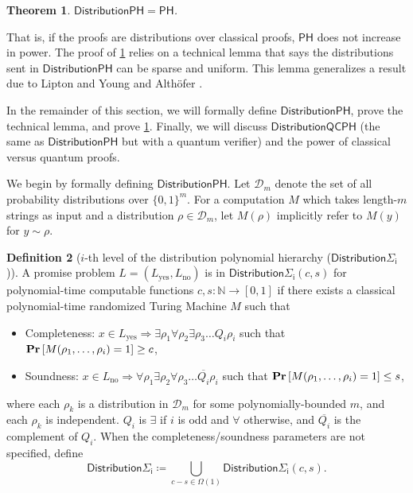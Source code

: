 \documentclass[10pt,a4paper]{article}
\newtheorem{theorem}{Theorem}[section]
\theoremstyle{definition}
\newtheorem{definition}[theorem]{Definition}
\renewcommand{\Pr}{\mathop{\bf Pr\/}}
\newcommand{\nats}{\mathbb N}
\newcommand{\N}{\nats}
\newcommand{\class}[1]{\ensuremath{\mathsf{#1}}\xspace}
\newcommand{\PH}{\class{PH}}
\newcommand{\distributionPH}{\mixedPH}
\newcommand{\distributionQCPH}{\mathsf{DistributionQCPH}}
\newcommand{\mixedPH}{\class{DistributionPH}}
\newcommand{\mixedSigmai}[1][i]{\mathsf{Distribution\Sigma_{#1}}}
\newcommand{\calD}{\mathcal{D}}
\begin{document}
\begin{theorem}\label{thm:mixedph=ph}
    $\mixedPH = \PH$.
\end{theorem}

That is, if the proofs are distributions over classical proofs, $\PH$ does not increase in power.
The proof of \cref{thm:mixedph=ph} relies on a technical lemma that says the distributions sent in $\mixedPH$ can be sparse and uniform. This lemma generalizes a result due to Lipton and Young \cite{lipton1994simple} and Althöfer \cite{ALTHOFER1994339}. 

In the remainder of this section, we will formally define $\distributionPH$, prove the technical lemma, and prove \cref{thm:mixedph=ph}. 
Finally, we will discuss $\distributionQCPH$ (the same as $\distributionPH$ but with a quantum verifier) and the power of classical versus quantum proofs.


We begin by formally defining $\mixedPH$.
Let $\calD_m$ denote the set of all probability distributions over $\{0,1\}^m$.
For a computation $M$ which takes length-$m$ strings as input and a distribution $\rho\in\calD_m$, let $M(\rho)$ implicitly refer to $M(y)$ for $y\sim \rho$.

\begin{definition}[$i$-th level of the distribution polynomial hierarchy ($\mixedSigmai$)]
    A promise problem $L =(L_{\text{yes}},L_{\text{no}})$ is in $\mixedSigmai(c,s)$ for polynomial-time computable functions $c,s : \N \to [0,1]$ if there exists a classical polynomial-time randomized Turing Machine $M$ such that
    \begin{itemize}
        \item Completeness: $x\in L_{\text{yes}} \Rightarrow \exists \rho_1 \forall \rho_2 \exists \rho_3 \dots Q_i \rho_i$ such that $\Pr\left[M(\rho_1,\dots,\rho_i) = 1\right] \geq c$,
        \item Soundness: $x\in L_{\text{no}} \Rightarrow \forall \rho_1 \exists \rho_2 \forall \rho_3 \dots \overline{Q_i} \rho_i$ such that $\Pr\left[M(\rho_1,\dots,\rho_i) = 1\right] \leq s$,
    \end{itemize}
    where each $\rho_k$ is a distribution in $\calD_m$ for some polynomially-bounded $m$, and each $\rho_k$ is independent.
    $Q_i$ is $\exists$ if $i$ is odd and $\forall$ otherwise, and $\overline{Q_i}$ is the complement of $Q_i$.
    When the completeness/soundness parameters are not specified, define
    \[
        \mixedSigmai[i] \coloneqq \bigcup_{c-s\in\Omega(1)} \mixedSigmai[i](c,s).
    \]
\end{definition}
\end{document}
